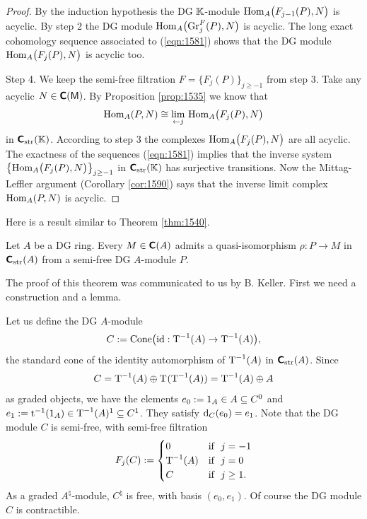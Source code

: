 \begin{proof}
By the induction hypothesis the DG $\mathbb{K}$-module  
$\operatorname{Hom}_{A} \bigl( F_{j - 1}(P), N \bigr)$
is acyclic. By step 2 the DG module
$\operatorname{Hom}_{A} \bigl( \operatorname{Gr}^F_{j}(P), N \bigr)$
is acyclic. The long exact cohomology sequence associated to 
(\ref{eqn:1581}) shows that the DG module 
$\operatorname{Hom}_{A} \bigl( F_j(P), N \bigr)$
is acyclic too.

\medskip \noindent
Step 4. We keep the semi-free filtration 
$F = \{ F_j(P) \}_{j \geq -1}$ from step 3. 
Take any acyclic $N \in \operatorname{\boldsymbol{\mathsf{C}}}(\operatorname{\mathsf{M}})$. By 
Proposition \ref{prop:1535} we know that 
\[ \operatorname{Hom}_{A}(P, N) \cong 
\lim_{\leftarrow j} \, \operatorname{Hom}_{A} \bigl( F_j(P), N \bigr) \]
in $\boldsymbol{\mathsf{C}}_{\mathrm{str}}(\mathbb{K})$. According to step 3 the complexes 
$\operatorname{Hom}_{A} \bigl( F_j(P), N \bigr)$ are all acyclic. 
The exactness of the sequences (\ref{eqn:1581}) implies that 
the inverse system \lb 
$\bigl\{ \operatorname{Hom}_{A} \bigl( F_j(P), N \bigr) \bigr\}_{j \geq -1}$
in $\boldsymbol{\mathsf{C}}_{\mathrm{str}}(\mathbb{K})$ has surjective transitions. Now the 
Mittag-Leffler argument (Corollary \ref{cor:1590}) says that the inverse limit 
complex $\operatorname{Hom}_{A}(P, N)$ is acyclic. 
\end{proof}

Here is a result similar to Theorem \ref{thm:1540}. 

\begin{thm} \label{thm:3305}
Let $A$ be a DG ring. Every $M \in \operatorname{\boldsymbol{\mathsf{C}}}(A)$ admits a quasi-iso\-morphism
$\rho : P \to M$ in $\boldsymbol{\mathsf{C}}_{\mathrm{str}}(A)$ from a semi-free DG $A$-module 
$P$.
\end{thm}

The proof of this theorem was communicated to us by B. Keller.
First we need a construction and a lemma. 

Let us define the DG $A$-module 
\begin{equation} \label{eqn:3307}
C := \operatorname{Cone} \bigl( \operatorname{id} : \operatorname{T}^{-1}(A) \to \operatorname{T}^{-1}(A) \bigr) , 
\end{equation}
the standard cone of the identity automorphism of $\operatorname{T}^{-1}(A)$
in $\boldsymbol{\mathsf{C}}_{\mathrm{str}}(A)$. Since
\[ C = \operatorname{T}^{-1}(A) \oplus \operatorname{T}^{}(\operatorname{T}^{-1}(A)) = 
\operatorname{T}^{-1}(A) \oplus A \]
as graded objects, we have the elements 
$e_0 := 1_A \in A \subseteq C^0$ and 
$e_1 := \operatorname{t}^{-1}(1_A) \in \operatorname{T}^{-1}(A)^1 \subseteq C^1$.
They satisfy $\mathrm{d}_C(e_0) = e_1$. 
Note that the DG module $C$ is semi-free, with semi-free filtration 
\begin{equation} \label{eqn:3332}
F_j(C) := 
\begin{cases}
0 & \textup{if} \ \ j = -1
\\
\operatorname{T}^{-1}(A) &  \textup{if} \ \ j = 0 
\\
C &  \textup{if} \ \ j \geq 1 .
\end{cases}
\end{equation}
As a graded $A^{\natural}$-module, $C^{\natural}$ is free, with basis 
$(e_0, e_1)$. Of course the DG module $C$ is contractible. 

